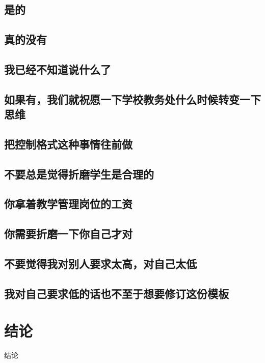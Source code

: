 \documentclass[a4paper,AutoFakeBold,oneside,12pt]{book}
\begin{document}
\section{是的}
\section{真的没有}
\section{我已经不知道说什么了}
\section{如果有，我们就祝愿一下学校教务处什么时候转变一下思维}
\section{把控制格式这种事情往前做}
\section{不要总是觉得折磨学生是合理的}
\section{你拿着教学管理岗位的工资}
\section{你需要折磨一下你自己才对}
\section{不要觉得我对别人要求太高，对自己太低}
\section{我对自己要求低的话也不至于想要修订这份模板}

\clearpage{}
\chapter*{结\qquad{}论}
\normalsize

结论


\clearpage{}

\end{document}
